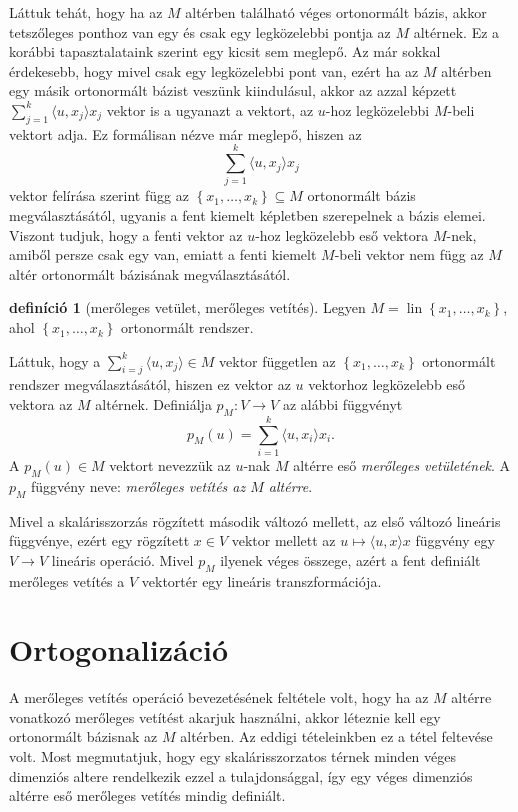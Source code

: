 \documentclass[9pt, a4paper, showtrims]{memoir}
\theoremstyle{plain}
\theoremstyle{remark}
\theoremstyle{definition}
\newtheorem{definition}[proposition]{definíció}
\DeclareMathOperator{\lin}{lin}
\newcommand{\ip}[2]{\langle#1,#2\rangle}
\begin{document}
Láttuk tehát, hogy ha az $M$ altérben található véges ortonormált bázis,
akkor tetszőleges ponthoz van egy és csak egy legközelebbi pontja az $M$ altérnek.
Ez a korábbi tapasztalataink szerint egy kicsit sem meglepő.
Az már sokkal érdekesebb, hogy mivel csak egy legközelebbi pont van, ezért
ha az $M$ altérben egy másik ortonormált bázist veszünk kiindulásul, akkor az azzal képzett
$\sum_{j=1}^k\ip{u}{x_j}x_j$ vektor is a ugyanazt a vektort, az $u$-hoz legközelebbi $M$-beli vektort adja.
Ez formálisan nézve már meglepő, hiszen az
\[
	\sum_{j=1}^k\ip{u}{x_j}x_j
\]
vektor felírása szerint függ az $\left\{ x_1,\ldots,x_k \right\}\subseteq M$ ortonormált bázis megválasztásától,
ugyanis a fent kiemelt képletben szerepelnek a bázis elemei.
Viszont tudjuk, hogy a fenti vektor az $u$-hoz legközelebb eső vektora $M$-nek, amiből persze csak egy van,
emiatt a fenti kiemelt $M$-beli vektor nem függ az $M$ altér ortonormált bázisának megválasztásától.
\begin{definition}[merőleges vetület, merőleges vetítés]
	Legyen $M=\lin\left\{ x_1,\ldots,x_k \right\}$,
	ahol $\left\{ x_1,\ldots,x_k \right\}$ ortonormált rendszer.

	Láttuk, hogy a
	$\sum_{i=j}^k\ip{u}{x_j}\in M$ vektor független
	az $\left\{ x_1,\ldots,x_k \right\}$ ortonormált rendszer megválasztásától,
	hiszen ez vektor az $u$ vektorhoz legközelebb eső vektora az $M$ altérnek.
	Definiálja $p_M:V\to V$ az alábbi függvényt
	\[
		p_M\left( u \right)=
		\sum_{i=1}^k\ip{u}{x_i}x_i.
	\]
	A $p_M\left( u \right)\in M$ vektort nevezzük az $u$-nak $M$ altérre eső \emph{merőleges vetületének}.
	A $p_M$ függvény neve: \emph{merőleges vetítés az $M$ altérre}.
\end{definition}
Mivel a skalárisszorzás rögzített második változó mellett,
az első változó lineáris függvénye,
ezért egy rögzített $x\in V$ vektor mellett az $u\mapsto\ip{u}{x}x$ függvény egy $V\to V$ lineáris operáció.
Mivel $p_M$ ilyenek véges összege, azért a fent definiált merőleges vetítés a $V$ vektortér egy lineáris transzformációja.
\section{Ortogonalizáció}
A merőleges vetítés operáció bevezetésének feltétele volt, hogy ha az $M$ altérre vonatkozó
merőleges vetítést akarjuk használni, akkor léteznie kell egy ortonormált bázisnak az $M$ altérben.
Az eddigi tételeinkben ez a tétel feltevése volt.
Most megmutatjuk, hogy egy skalárisszorzatos térnek minden véges dimenziós altere rendelkezik ezzel a
tulajdonsággal, így egy véges dimenziós altérre eső merőleges vetítés mindig definiált.
\end{document}
